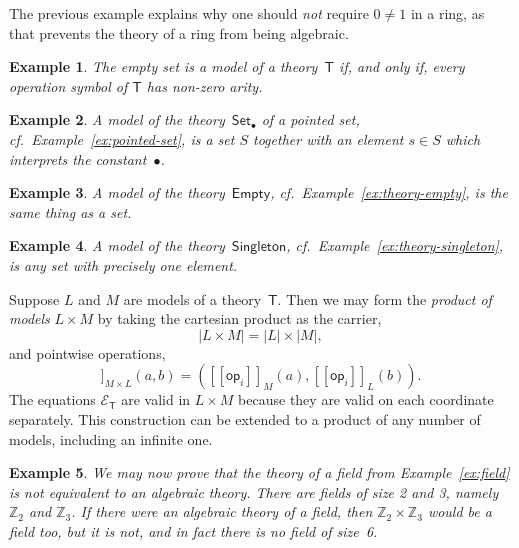 \documentclass{amsart}
\newcommand{\ZZ}{\mathbb{Z}} %
\newcommand{\theory}[1]{\mathsf{#1}} %
\newcommand{\equations}[1]{\mathcal{E}_{\theory{#1}}} %
\newcommand{\carrier}[1]{|#1|} %
\newcommand{\op}[1]{\mathsf{op}_{#1}} %
\newcommand{\sem}[1]{[\![#1]\!]} %
\newtheorem{example}{Example}[section]
\begin{document}
The previous example explains why one should \emph{not} require $0 \neq 1$ in a ring, as
that prevents the theory of a ring from being algebraic.

\begin{example}
  The empty set is a model of a theory~$\theory{T}$ if, and only if, every operation symbol
  of $\theory{T}$ has non-zero arity.
\end{example}

\begin{example}
  A model of the theory~$\theory{Set_\bullet}$ of a pointed set, cf.\
  Example~\ref{ex:pointed-set}, is a set $S$ together with an element $s \in S$ which
  interprets the constant~$\bullet$.
\end{example}

\begin{example}
  A model of the theory~$\theory{Empty}$, cf.\ Example~\ref{ex:theory-empty}, is the same
  thing as a set.
\end{example}

\begin{example}
  A model of the theory~$\theory{Singleton}$, cf.\ Example~\ref{ex:theory-singleton}, is
  any set with precisely one element.
\end{example}

Suppose $L$ and $M$ are models of a theory~$\theory{T}$. Then we may form the
\emph{product of models} $L \times M$ by taking the cartesian product as the carrier,
%
\begin{equation*}
  \carrier{L \times M} = \carrier{L} \times \carrier{M},
\end{equation*}
%
and pointwise operations,
%
\begin{equation*}
  \sem{\op{i}}_{M \times L}(a, b) = (\sem{\op{i}}_M(a), \sem{\op{i}}_L(b)).
\end{equation*}
%
The equations $\equations{T}$ are valid in $L \times M$ because they are valid on each
coordinate separately. This construction can be extended to a product of any number of
models, including an infinite one.

\begin{example}
  We may now prove that the theory of a field from Example~\ref{ex:field} is not
  equivalent to an algebraic theory. There are fields of size 2 and 3, namely $\ZZ_2$ and
  $\ZZ_3$. If there were an algebraic theory of a field, then $\ZZ_2 \times \ZZ_3$ would
  be a field too, but it is not, and in fact there is no field of size~6.
\end{example}
\end{document}
